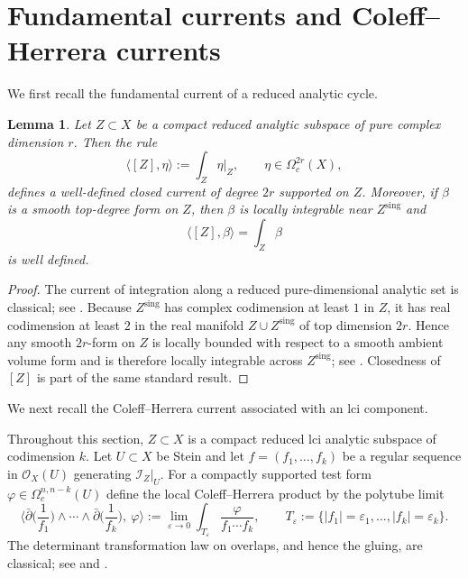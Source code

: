 \documentclass[12pt,a4paper,dvipsnames,x11names]{amsart}
\numberwithin{equation}{section}
\theoremstyle{plain}
\newtheorem{lemma}[theorem]{Lemma}
\theoremstyle{definition}
\theoremstyle{remark}
\newcommand{\II}{\mathscr I}
\newcommand{\OO}{\mathscr O}
\newcommand{\sing}{\mathrm{sing}}
\begin{document}
\section{Fundamental currents and Coleff--Herrera currents}\label{sec:CH}

We first recall the fundamental current of a reduced analytic cycle.

\begin{lemma}\label{lem:fundamental-current}
Let $Z\subset X$ be a compact reduced analytic subspace of pure complex dimension $r$. Then the rule
\begin{equation}\label{eq:fund-current}
\langle [Z],\eta\rangle:=\int_{Z}\eta|_{Z},
\qquad \eta\in \Omega_c^{2r}(X),
\end{equation}
defines a well-defined closed current of degree $2r$ supported on $Z$. Moreover, if $\beta$ is a smooth top-degree form on $Z$, then $\beta$ is locally integrable near $Z^\sing$ and
\begin{equation}\label{eq:pairing-fund-current}
\langle [Z],\beta\rangle=\int_{Z}\beta
\end{equation}
is well defined.
\end{lemma}

\begin{proof}
The current of integration along a reduced pure-dimensional analytic set is classical; see \cite{King71,HarveyShiffman74}. Because $Z^\sing$ has complex codimension at least $1$ in $Z$, it has real codimension at least $2$ in the real manifold $Z\cup Z^\sing$ of top dimension $2r$. Hence any smooth $2r$-form on $Z$ is locally bounded with respect to a smooth ambient volume form and is therefore locally integrable across $Z^\sing$; see \cite[\S III.3]{Demailly}. Closedness of $[Z]$ is part of the same standard result.
\end{proof}

We next recall the Coleff--Herrera current associated with an lci component.

Throughout this section, $Z\subset X$ is a compact reduced lci analytic subspace of codimension $k$.
Let $U\subset X$ be Stein and let $f=(f_1,\dots,f_k)$ be a regular sequence in $\OO_X(U)$ generating $\II_Z|_U$.
For a compactly supported test form $\varphi\in \Omega_c^{n,n-k}(U)$ define the local Coleff--Herrera product by the polytube limit
\begin{equation}\label{eq:CH-def}
\Big\langle \bar\partial\Big(\frac{1}{f_1}\Big)\wedge\cdots\wedge \bar\partial\Big(\frac{1}{f_k}\Big),\ \varphi\Big\rangle
:=
\lim_{\varepsilon\to 0}\int_{T_\varepsilon}\frac{\varphi}{f_1\cdots f_k},
\qquad
T_\varepsilon:=\{|f_1|=\varepsilon_1,\dots,|f_k|=\varepsilon_k\}.
\end{equation}
The determinant transformation law on overlaps, and hence the gluing, are classical; see \cite{CH78,Passare88} and \cite[\S III]{Demailly}.
\end{document}
